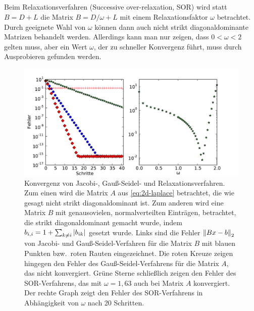 \subsection{}

Beim Relaxationsverfahren (Successive over-relaxation, SOR) wird statt
$B = D + L$ die Matrix $B = D/\omega + L$ mit einem Relaxationsfaktor
$\omega$ betrachtet. Durch geeignete Wahl von $\omega$ können dann
auch nicht strikt diagonaldominante Matrizen behandelt
werden. Allerdings kann man nur zeigen, dass $0<\omega< 2$ gelten
muss, aber ein Wert $\omega$, der zu schneller Konvergenz führt, muss
durch Ausprobieren gefunden werden.

\begin{figure}
  \centering
  \includegraphics[width=\textwidth]{plots/iterative}
  \caption{Konvergenz von Jacobi-, Gauß-Seidel- und
    Relaxationsverfahren. Zum einen wird die Matrix $A$ aus
    \eqref{eq:2d-laplace} betrachtet, die wie gesagt nicht strikt
    diagonaldominant ist. Zum anderen wird eine Matrix $B$ mit
    genausovielen, normalverteilten Einträgen, betrachtet, die strikt
    diagonaldominant gemacht wurde, indem $b_{i,i} = 1+ \sum_{k\neq
      i}\left\lvert{b_{ik}}\right\rvert$ gesetzt wurde. Links sind die Fehler
    $\left\lVert{Bx-b}\right\rVert_2$ von Jacobi- und Gauß-Seidel-Verfahren für die
    Matrix $B$ mit blauen Punkten bzw.\ roten Rauten eingezeichnet. Die
    roten Kreuze zeigen hingegen den Fehler des Gauß-Seidel-Verfahrens
    für die Matrix $A$, das nicht konvergiert. Grüne Sterne
    schließlich zeigen den Fehler des SOR-Verfahrens, das mit
    $\omega=1,63$ auch bei Matrix $A$ konvergiert. Der rechte Graph
    zeigt den Fehler des SOR-Verfahrens in Abhängigkeit von $\omega$
    nach 20 Schritten.}
  \label{fig:sor}
\end{figure}


